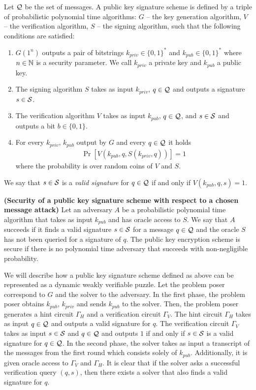 \begin{definition}
Let $\mathcal{Q}$ be the set of messages. A \textnormal{public key signature scheme} is defined by a triple of probabilistic polynomial time algorithms:
$G$ -- the key generation algorithm,
$V$ -- the verification algorithm,
$S$ -- the signing algorithm,
such that the following conditions are satisfied:
\begin{enumerate}[-]
  \item $G(1^n)$ outputs a pair of bitstrings $k_{priv} \in \{0,1\}^{*}$ and $k_{pub} \in \{0,1\}^{*}$ where $n \in \mathbb{N}$ is a security parameter.
    We call $k_{priv}$ a private key and $k_{pub}$ a public key.
  \item The signing algorithm $S$ takes as input $k_{priv}$, $q \in \mathcal{Q}$ and outputs a signature $s \in \mathcal{S}$.
  \item The verification algorithm $V$ takes as input $k_{pub}$, $q \in \mathcal{Q}$, and $s \in \mathcal{S}$ and outputs a bit $b \in \{0,1\}$.
  \item For every $k_{priv}$, $k_{pub}$ output by $G$ and every $q \in \mathcal{Q}$ it holds
    \begin{align*}
      \Pr[V(k_{pub}, q, S(k_{priv}, q))] = 1
    \end{align*}
    where the probability is over random coins of $V$ and $S$.
\end{enumerate}
\end{definition}
We say that $s \in \mathcal{S}$ is a \textit{valid signature} for $q \in \mathcal{Q}$ if and only if $V(k_{pub}, q, s) = 1$.
%
%
\begin{definition}\textbf{(Security of a public key signature scheme with respect to a chosen message attack)}
Let an \textnormal{adversary} $A$ be a probabilistic polynomial time algorithm that takes as input $k_{pub}$ and has oracle access to $S$.
We say that $A$ \textnormal{succeeds} if it finds a valid signature $s \in \mathcal{S}$ for a message $q \in \mathcal{Q}$ and the oracle $S$ has not been queried for a signature of $q$.
The public key encryption scheme is \textnormal{secure} if there is no polynomial time adversary that succeeds with non-negligible probability.
\end{definition}
%
We will describe how a public key signature scheme defined as above can be represented as a dynamic weakly verifiable puzzle.
Let the problem poser correspond to $G$ and the solver to the adversary.
In the first phase, the problem poser obtains $k_{pub}$, $k_{priv}$ and sends $k_{pub}$ to the solver.
Then, the problem poser generates a hint circuit $\Gamma_H$ and a verification circuit $\Gamma_V$.
The hint circuit $\Gamma_H$ takes as input $q \in \mathcal{Q}$ and outputs a valid signature for $q$. The verification circuit
$\Gamma_V$ takes as input $s \in \mathcal{S}$ and $q \in \mathcal{Q}$ and outputs $1$ if and only if $s \in \mathcal{S}$ is a valid signature for $q \in \mathcal{Q}$.
In the second phase, the solver takes as input a transcript of the messages from the first round which consists solely of $k_{pub}$.
Additionally, it is given oracle access to $\Gamma_V$ and $\Gamma_H$.
It is clear that if the solver asks a successful verification query $(q,s)$, then there exists a solver that also finds a valid signature for $q$.

